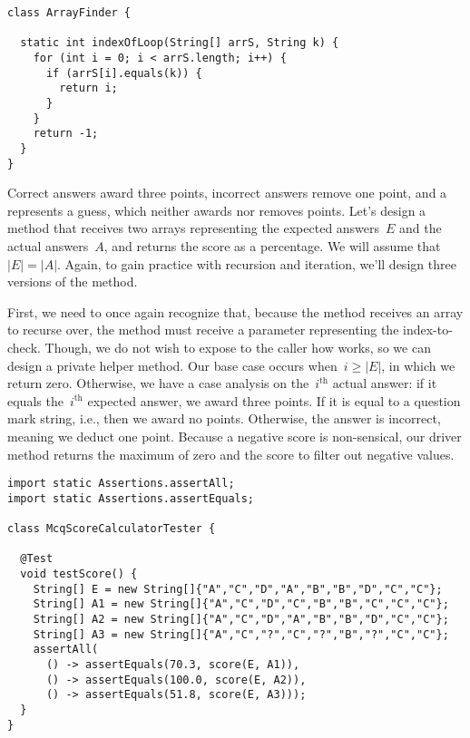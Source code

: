 \begin{lstlisting}[language=MyJava]
class ArrayFinder {
  
  static int indexOfLoop(String[] arrS, String k) {
    for (int i = 0; i < arrS.length; i++) {
      if (arrS[i].equals(k)) { 
        return i; 
      }
    }
    return -1;
  }
}
\end{lstlisting}

 Correct answers award three points, incorrect answers remove one point, and a  represents a guess, which neither awards nor removes points. 
Let's design a method that receives two  arrays representing the expected answers~$E$ and the actual answers~$A$, and returns the score as a percentage. 
We will assume that~$|E|=|A|$. 
Again, to gain practice with recursion and iteration, we'll design three versions of the  method.

First, we need to once again recognize that, because the method receives an array to recurse over, the method must receive a parameter representing the index-to-check. 
Though, we do not wish to expose to the caller how  works, so we can design a private helper method. 
Our base case occurs when~$i \geq |E|$, in which we return zero. 
Otherwise, we have a case analysis on the~$i^\text{th}$ actual answer: if it equals the~$i^\text{th}$ expected answer, we award three points. 
If it is equal to a question mark string, i.e.,  then we award no points. 
Otherwise, the answer is incorrect, meaning we deduct one point. 
Because a negative score is non-sensical, our driver method returns the maximum of zero and the score to filter out negative values.

\begin{lstlisting}[language=MyJava]
import static Assertions.assertAll;
import static Assertions.assertEquals;

class McqScoreCalculatorTester {

  @Test
  void testScore() {    
    String[] E = new String[]{"A","C","D","A","B","B","D","C","C"};
    String[] A1 = new String[]{"A","C","D","C","B","B","C","C","C"};
    String[] A2 = new String[]{"A","C","D","A","B","B","D","C","C"};
    String[] A3 = new String[]{"A","C","?","C","?","B","?","C","C"};
    assertAll(
      () -> assertEquals(70.3, score(E, A1)),
      () -> assertEquals(100.0, score(E, A2)),
      () -> assertEquals(51.8, score(E, A3)));
  }
}
\end{lstlisting}

